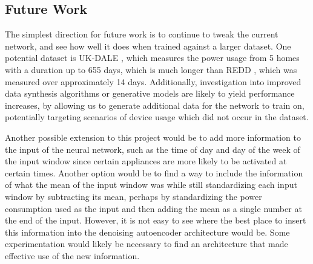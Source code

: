 \documentclass{article}
\begin{document}
\begin{figure}
  \label{fig:WasherDryer}
\end{figure}

\subsection{Future Work}
The simplest direction for future work is to continue to tweak the current network, and see how well it does when trained against a larger dataset.
One potential dataset is UK-DALE \cite{Kelly2}, which measures the power usage from 5 homes with a duration up to 655 days, which is much longer than REDD \cite{Redd}, which was measured over approximately 14 days.
Additionally, investigation into improved data synthesis algorithms or generative models are likely to yield performance increases, by allowing us to generate additional data for the network to train on, potentially targeting scenarios of device usage which did not occur in the dataset.

Another possible extension to this project would be to add more information to the input of the neural network, such as the time of day and day of the week of the input window since certain appliances are more likely to be activated at certain times. Another option would be to find a way to include the information of what the mean of the input window was while still standardizing each input window by subtracting its mean\cite{Kelly}, perhaps by standardizing the power consumption used as the input and then adding the mean as a single number at the end of the input. However, it is not easy to see where the best place to insert this information into the denoising autoencoder architecture would be. Some experimentation would likely be necessary to find an architecture that made effective use of the new information.
\end{document}
